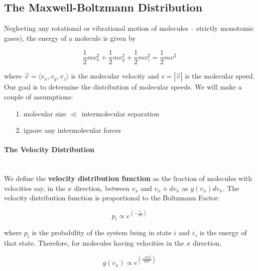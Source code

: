 \documentclass[svgnames]{article}     %
\begin{document}
\subsection{The Maxwell-Boltzmann Distribution}

Neglecting any rotational or vibrational motion of molecules -- strictly
monotomic gases), the energy of a molecule is given by 

\[
\frac{1}{2}mv_x^2 + \frac{1}{2}mv_y^2 + \frac{1}{2}mv_z^2 = \frac{1}{2}mv^2
\] \vspace{5px}

where $\vec{v} = \langle v_x, v_y, v_z \rangle$ is the molecular velocity and
$v = |\vec{v}|$ is the molecular speed. Our goal is to determine the
distribution of molecular speeds. We will make a couple of assumptions: 

\begin{itemize}
  \item[1.] molecular size $\ll$ intermolecular separation
  \item[2.] ignore any intermolecular forces 
\end{itemize}

\paragraph{The Velocity Distribution} \mbox{} \\

We define the \textbf{velocity distribution function} as the fraction of
molecules with velocities say, in the $x$ direction, between $v_x$ and $v_x
+ dv_x$ as $g(v_x)dv_x$. The velocity distribution function is proportional to
the Boltzmann Factor: 

\[
  p_i \propto e^{\left( -\frac{\varepsilon_i}{kT} \right)}  
\] \vspace{5px}

where $p_i$ is the probability of the system being in state $i$ and
$\varepsilon_i$ is the energy of that state. Therefore, for molecules having
velocities in the $x$ direction, 

\[
  g(v_x) \propto e^{\left( \frac{-mv_x^2}{2kT} \right)} 
\] \vspace{5px}

\begin{center}
\end{center}
\end{document}
